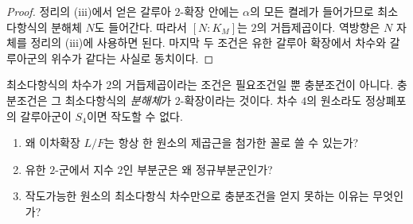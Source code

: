 \begin{proof}
정리의 (iii)에서 얻은 갈루아 $2$-확장 안에는 $\alpha$의 모든 켤레가 들어가므로 최소다항식의 분해체 $N$도 들어간다. 따라서 $[N:K_M]$는 $2$의 거듭제곱이다. 역방향은 $N$ 자체를 정리의 (iii)에 사용하면 된다. 마지막 두 조건은 유한 갈루아 확장에서 차수와 갈루아군의 위수가 같다는 사실로 동치이다.
\end{proof}

\begin{pitfall}
최소다항식의 차수가 $2$의 거듭제곱이라는 조건은 필요조건일 뿐 충분조건이 아니다. 충분조건은 그 최소다항식의 \emph{분해체}가 $2$-확장이라는 것이다. 차수 $4$의 원소라도 정상폐포의 갈루아군이 $S_4$이면 작도할 수 없다.
\end{pitfall}

\begin{checkpoint}
\begin{enumerate}[label=(\alph*)]
  \item 왜 이차확장 $L/F$는 항상 한 원소의 제곱근을 첨가한 꼴로 쓸 수 있는가?
  \item 유한 $2$-군에서 지수 $2$인 부분군은 왜 정규부분군인가?
  \item 작도가능한 원소의 최소다항식 차수만으로 충분조건을 얻지 못하는 이유는 무엇인가?
\end{enumerate}
\end{checkpoint}
